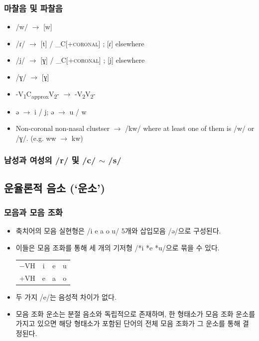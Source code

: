 \subsubsection{마찰음 및 파찰음}
\begin{itemize}
\item /w/ $\rightarrow$ [w]
\item /ɾ/ $\rightarrow$ [t] / \_C[+\textsc{coronal}] ; [ɾ] elsewhere
\item /j/ $\rightarrow$ [ɣ] / \_C[+\textsc{coronal}] ; [j] elsewhere
\item /ɣ/ $\rightarrow$ [ɣ]
\item -V\textsubscript{1}C\textsubscript{approx}V\textsubscript{2}- $\rightarrow$ -V\textsubscript{2}V\textsubscript{2}-
\item ə $\rightarrow$ i / j; ə $\rightarrow$ u / w
\item Non-coronal non-nasal clustser $\rightarrow$ /kw/ where at least one of them is /w/ or /ɣ/. (e.g. ww $\rightarrow$ kw)
\end{itemize}

\subsubsection{남성과 여성의 /r/ 및 /c/ $\sim$ /s/}
\omission

\subsection{운율론적 음소 (`운소')}
\subsubsection{모음과 모음 조화}
\begin{itemize}
\item 축치어의 모음 실현형은 /i e a o u/ 5개와 삽입모음 /ə/으로 구성된다. 
\item 이들은 모음 조화를 통해 세 개의 기저형 /*i *e *u/으로 묶을 수 있다.
\begin{center}
\begin{tabular}{|l|ccc|}\hline
$-$VH	&i	&e	&u\\
$+$VH	&e	&a	&o\\
\hline
\end{tabular}
\end{center}
\item 두 가지 /e/는 음성적 차이가 없다.
\item 모음 조화 운소는 분절 음소와 독립적으로 존재하며, 한 형태소가 모음 조화 운소를 가지고 있으면 해당 형태소가 포함된 단어의 전체 모음 조화가 그 운소를 통해 결정된다.
\end{itemize}


